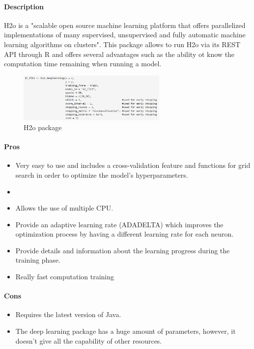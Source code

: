 \documentclass[6pt,letter]{article}\usepackage[]{graphicx}\usepackage[]{color}
\begin{document}
\paragraph{Description}
H2o is a "scalable open source machine learning platform that offers parallelized implementations of many supervised, unsupervised and fully automatic machine learning algorithms on clusters". This package allows to run H2o via its REST API through R and offers several advantages such as the ability ot know the computation time remaining when running a model.
\begin{figure}[h]
    \centering
    \includegraphics[width=0.65\textwidth]{figure/h2o_package.png}
     \caption{H2o package}
\end{figure}

\paragraph{Pros}
\begin{itemize}
\item Very easy to use and includes a cross-validation feature and functions for grid search in order to optimize the model's hyperparameters.
\item 
\item Allows the use of multiple CPU.
\item Provide an adaptive learning rate (ADADELTA) which improves the optimization process by having a different learning rate for each neuron.
\item Provide details and information about the learning progress during the training phase.
\item Really fast computation training
\end{itemize}
\paragraph{Cons}
\begin{itemize}
\item Requires the latest version of Java.
\item The deep learning package has a huge amount of parameters, however, it doesn't give all the capability of other resources.
\end{itemize}
\end{document}
